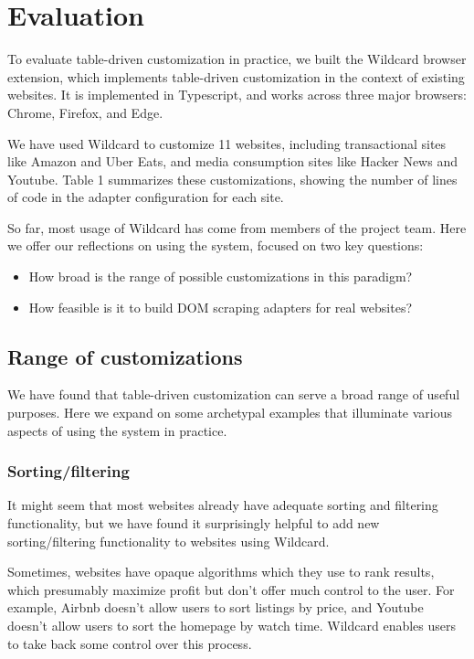 \documentclass[sigplan,10pt,anonymous,review]{acmart}
\providecommand{\tightlist}{%
  \setlength{\itemsep}{0pt}\setlength{\parskip}{0pt}}
\begin{document}
\hypertarget{sec:evaluation}{%
\section{Evaluation}\label{sec:evaluation}}

To evaluate table-driven customization in practice, we built the
Wildcard browser extension, which implements table-driven customization
in the context of existing websites. It is implemented in Typescript,
and works across three major browsers: Chrome, Firefox, and Edge.

We have used Wildcard to customize 11 websites, including transactional
sites like Amazon and Uber Eats, and media consumption sites like Hacker
News and Youtube. Table 1 summarizes these customizations, showing the
number of lines of code in the adapter configuration for each site.

So far, most usage of Wildcard has come from members of the project
team. Here we offer our reflections on using the system, focused on two
key questions:

\begin{itemize}
\tightlist
\item
  How broad is the range of possible customizations in this paradigm?
\item
  How feasible is it to build DOM scraping adapters for real websites?
\end{itemize}

\hypertarget{range-of-customizations}{%
\subsection{Range of customizations}\label{range-of-customizations}}

We have found that table-driven customization can serve a broad range of
useful purposes. Here we expand on some archetypal examples that
illuminate various aspects of using the system in practice.

\hypertarget{sortingfiltering}{%
\subsubsection{Sorting/filtering}\label{sortingfiltering}}

It might seem that most websites already have adequate sorting and
filtering functionality, but we have found it surprisingly helpful to
add new sorting/filtering functionality to websites using Wildcard.

Sometimes, websites have opaque algorithms which they use to rank
results, which presumably maximize profit but don't offer much control
to the user. For example, Airbnb doesn't allow users to sort listings by
price, and Youtube doesn't allow users to sort the homepage by watch
time. Wildcard enables users to take back some control over this
process.
\end{document}
